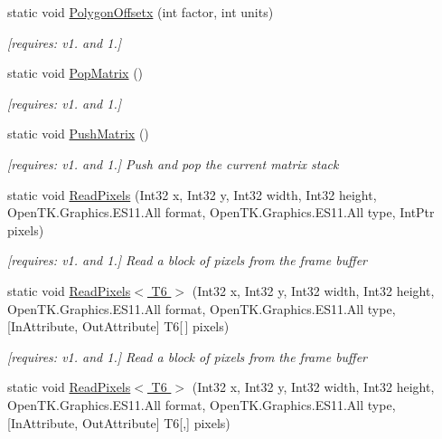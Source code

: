 \begin{DoxyCompactItemize}
static void \hyperlink{class_open_t_k_1_1_graphics_1_1_e_s11_1_1_g_l_a5d87fc768869a4a05fd1cfa214ed7b9f}{Polygon\-Offsetx} (int factor, int units)
\begin{DoxyCompactList}\small\item\em \mbox{[}requires\-: v1. and 1.\mbox{]}\end{DoxyCompactList}\item 
static void \hyperlink{class_open_t_k_1_1_graphics_1_1_e_s11_1_1_g_l_a7b7373dce4dd1ffb9849028612ad6f23}{Pop\-Matrix} ()
\begin{DoxyCompactList}\small\item\em \mbox{[}requires\-: v1. and 1.\mbox{]}\end{DoxyCompactList}\item 
static void \hyperlink{class_open_t_k_1_1_graphics_1_1_e_s11_1_1_g_l_aa01287cd70518d6cfc15e8f27be486be}{Push\-Matrix} ()
\begin{DoxyCompactList}\small\item\em \mbox{[}requires\-: v1. and 1.\mbox{]} Push and pop the current matrix stack \end{DoxyCompactList}\item 
static void \hyperlink{class_open_t_k_1_1_graphics_1_1_e_s11_1_1_g_l_a53c91ce49e92a4dfd6a128e43016f5f9}{Read\-Pixels} (Int32 x, Int32 y, Int32 width, Int32 height, Open\-T\-K.\-Graphics.\-E\-S11.\-All format, Open\-T\-K.\-Graphics.\-E\-S11.\-All type, Int\-Ptr pixels)
\begin{DoxyCompactList}\small\item\em \mbox{[}requires\-: v1. and 1.\mbox{]} Read a block of pixels from the frame buffer \end{DoxyCompactList}\item 
static void \hyperlink{class_open_t_k_1_1_graphics_1_1_e_s11_1_1_g_l_ae62bc53ff13a0b5a2d4accf98220a78d}{Read\-Pixels$<$ T6 $>$} (Int32 x, Int32 y, Int32 width, Int32 height, Open\-T\-K.\-Graphics.\-E\-S11.\-All format, Open\-T\-K.\-Graphics.\-E\-S11.\-All type, \mbox{[}In\-Attribute, Out\-Attribute\mbox{]} T6\mbox{[}$\,$\mbox{]} pixels)
\begin{DoxyCompactList}\small\item\em \mbox{[}requires\-: v1. and 1.\mbox{]} Read a block of pixels from the frame buffer \end{DoxyCompactList}\item 
static void \hyperlink{class_open_t_k_1_1_graphics_1_1_e_s11_1_1_g_l_a6e4844f8afeb21b4566cd240eb2f120f}{Read\-Pixels$<$ T6 $>$} (Int32 x, Int32 y, Int32 width, Int32 height, Open\-T\-K.\-Graphics.\-E\-S11.\-All format, Open\-T\-K.\-Graphics.\-E\-S11.\-All type, \mbox{[}In\-Attribute, Out\-Attribute\mbox{]} T6\mbox{[},\mbox{]} pixels)

\end{DoxyCompactItemize}
